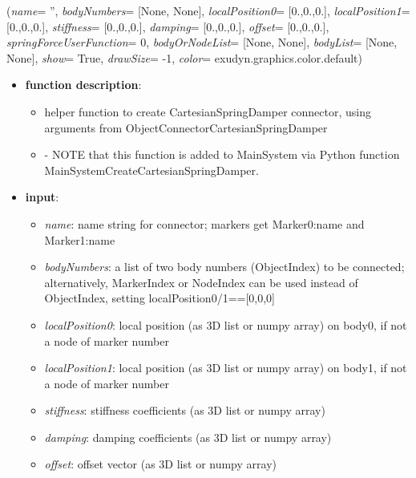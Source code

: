 %
\begin{flushleft}
\label{sec:mainsystemextensions:CreateCartesianSpringDamper}
({\it name}= '', {\it bodyNumbers}= [None, None], {\it localPosition0}= [0.,0.,0.], {\it localPosition1}= [0.,0.,0.], {\it stiffness}= [0.,0.,0.], {\it damping}= [0.,0.,0.], {\it offset}= [0.,0.,0.], {\it springForceUserFunction}= 0, {\it bodyOrNodeList}= [None, None], {\it bodyList}= [None, None], {\it show}= True, {\it drawSize}= -1, {\it color}= exudyn.graphics.color.default)
\end{flushleft}
\setlength{\itemindent}{0.7cm}
\begin{itemize}[leftmargin=0.7cm]
\item[--]
{\bf function description}: \vspace{-6pt}
\begin{itemize}[leftmargin=1.2cm]
\setlength{\itemindent}{-0.7cm}
\item[]helper function to create CartesianSpringDamper connector, using arguments from ObjectConnectorCartesianSpringDamper
\item[]- NOTE that this function is added to MainSystem via Python function MainSystemCreateCartesianSpringDamper.
\end{itemize}
\item[--]
{\bf input}: \vspace{-6pt}
\begin{itemize}[leftmargin=1.2cm]
\setlength{\itemindent}{-0.7cm}
\item[]{\it name}: name string for connector; markers get Marker0:name and Marker1:name
\item[]{\it bodyNumbers}: a list of two body numbers (ObjectIndex) to be connected; alternatively, MarkerIndex or NodeIndex can be used instead of ObjectIndex, setting localPosition0/1==[0,0,0]
\item[]{\it localPosition0}: local position (as 3D list or numpy array) on body0, if not a node of marker number
\item[]{\it localPosition1}: local position (as 3D list or numpy array) on body1, if not a node of marker number
\item[]{\it stiffness}: stiffness coefficients (as 3D list or numpy array)
\item[]{\it damping}: damping coefficients (as 3D list or numpy array)
\item[]{\it offset}: offset vector (as 3D list or numpy array)

\end{itemize}
\end{itemize}
